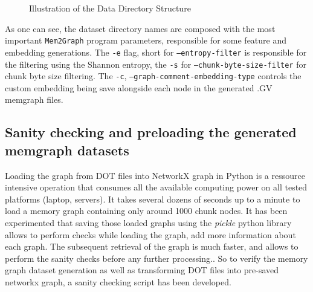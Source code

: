 \begin{figure}[H]
    \centering
    \caption{Illustration of the Data Directory Structure}
    \label{fig:data_structure}
    \begin{minipage}{0.8\textwidth}
    \end{minipage}
\end{figure}

As one can see, the dataset directory names are composed with the most important \texttt{Mem2Graph} program parameters, responsible for some feature and embedding generations. The \texttt{-e} flag, short for \texttt{--entropy-filter} is responsible for the filtering using the Shannon entropy, the \texttt{-s} for \texttt{--chunk-byte-size-filter} for chunk byte size filtering. The \texttt{-c}, \texttt{--graph-comment-embedding-type} controls the custom embedding being save alongside each node in the generated .GV memgraph files.

\subsection{Sanity checking and preloading the generated memgraph datasets}
Loading the graph from DOT files into NetworkX graph in Python is a ressource intensive operation that consumes all the available computing power on all tested platforms (laptop, servers). It takes several dozens of seconds up to a minute to load a memory graph containing only around 1000 chunk nodes. It has been experimented that saving those loaded graphs using the \textit{pickle} python library allows to perform checks while loading the graph, add more information about each graph. The subsequent retrieval of the graph is much faster, and allows to perform the sanity checks before any further processing.. So to verify the memory graph dataset generation as well as transforming DOT files into pre-saved networkx graph, a sanity checking script has been developed.

